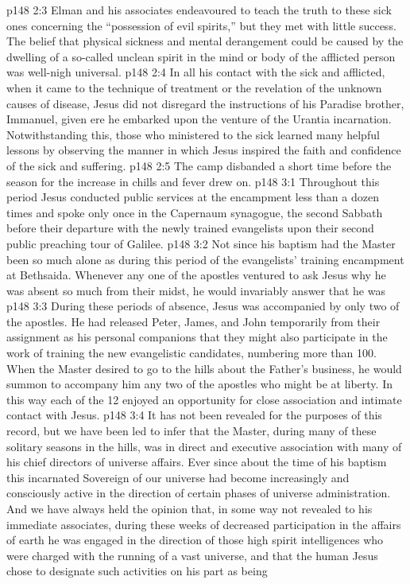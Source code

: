 \vs p148 2:3 Elman and his associates endeavoured to teach the truth to these sick ones concerning the “possession of evil spirits,” but they met with little success. The belief that physical sickness and mental derangement could be caused by the dwelling of a so\hyp{}called unclean spirit in the mind or body of the afflicted person was well\hyp{}nigh universal.
\vs p148 2:4 In all his contact with the sick and afflicted, when it came to the technique of treatment or the revelation of the unknown causes of disease, Jesus did not disregard the instructions of his Paradise brother, Immanuel, given ere he embarked upon the venture of the Urantia incarnation. Notwithstanding this, those who ministered to the sick learned many helpful lessons by observing the manner in which Jesus inspired the faith and confidence of the sick and suffering.
\vs p148 2:5 The camp disbanded a short time before the season for the increase in chills and fever drew on.
\vs p148 3:1 Throughout this period Jesus conducted public services at the encampment less than a dozen times and spoke only once in the Capernaum synagogue, the second Sabbath before their departure with the newly trained evangelists upon their second public preaching tour of Galilee.
\vs p148 3:2 Not since his baptism had the Master been so much alone as during this period of the evangelists’ training encampment at Bethsaida. Whenever any one of the apostles ventured to ask Jesus why he was absent so much from their midst, he would invariably answer that he was 
\vs p148 3:3 During these periods of absence, Jesus was accompanied by only two of the apostles. He had released Peter, James, and John temporarily from their assignment as his personal companions that they might also participate in the work of training the new evangelistic candidates, numbering more than 100. When the Master desired to go to the hills about the Father’s business, he would summon to accompany him any two of the apostles who might be at liberty. In this way each of the 12 enjoyed an opportunity for close association and intimate contact with Jesus.
\vs p148 3:4 It has not been revealed for the purposes of this record, but we have been led to infer that the Master, during many of these solitary seasons in the hills, was in direct and executive association with many of his chief directors of universe affairs. Ever since about the time of his baptism this incarnated Sovereign of our universe had become increasingly and consciously active in the direction of certain phases of universe administration. And we have always held the opinion that, in some way not revealed to his immediate associates, during these weeks of decreased participation in the affairs of earth he was engaged in the direction of those high spirit intelligences who were charged with the running of a vast universe, and that the human Jesus chose to designate such activities on his part as being 
